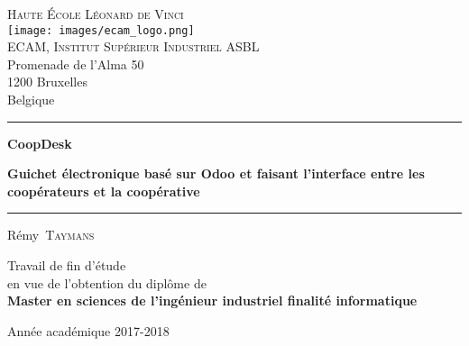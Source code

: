 \documentclass[
    a4paper,
    11pt,
    oneside
]{report}
\begin{document}
    \begin{titlepage}
        \sffamily

        \begin{center}
            \large
            \textsc{Haute École Léonard de Vinci} \\
            \centering
            \texttt{[image: images/ecam\_logo.png]} \\
            \textsc{ECAM, Institut Supérieur Industriel ASBL} \\
            {\small
                Promenade de l'Alma 50 \\
                1200 Bruxelles \\
                Belgique
            }
        \end{center}


        \begin{center}
            \rule{\textwidth}{1pt}
            {\huge\bfseries
                CoopDesk \par
            }
            \vspace{\baselineskip}
            {\LARGE\bfseries
                Guichet électronique basé sur Odoo et faisant
                l'interface entre les coopérateurs et la coopérative
            }
            \rule{\textwidth}{1pt}
        \end{center}


        \begin{center}
            {\Large
                Rémy~\textsc{Taymans}
            }
        \end{center}


        \begin{center}
            {\large
                Travail de fin d'étude \\
                en vue de l'obtention du diplôme de \\
                \textbf{
                    Master en sciences de l'ingénieur industriel
                    finalité informatique
                }
            }
        \end{center}


        \vfill

        \begin{center}
            {\large
                Année académique 2017-2018
            }
        \end{center}

        \normalfont
        \thispagestyle{empty}
    \end{titlepage}
\end{document}
